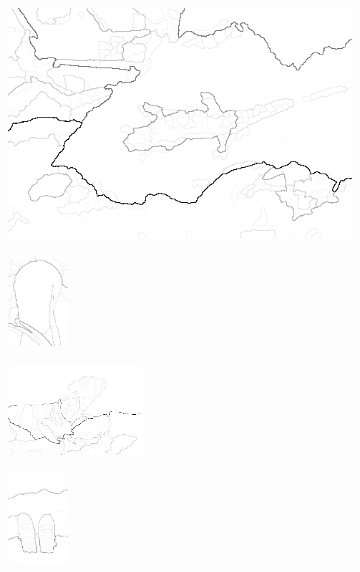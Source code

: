 \documentclass[journal]{IEEEtran}
\begin{document}
\begin{figure}[!ht]
    \begin{subfigure}[t]{\textwidth+20pt\relax}
    	\centering
    	\includegraphics[width=\dimexpr\linewidth-20pt\relax]{175083_2500sp_higra} 
    \end{subfigure}      
    \begin{subfigure}[b]{0.23\textwidth}
    	\centering
        \includegraphics[height=67.68857pt]{101084_2500sp_higra}
    \end{subfigure}
    \begin{subfigure}[b]{0.23\textwidth}
    	\centering
        \includegraphics[height=67.68857pt]{41096_2500sp_higra}
    \end{subfigure}
    \begin{subfigure}[b]{0.23\textwidth}
    	\centering
        \includegraphics[height=67.68857pt]{2018_2500sp_higra}
    \end{subfigure}   
    

\end{figure}
\end{document}
